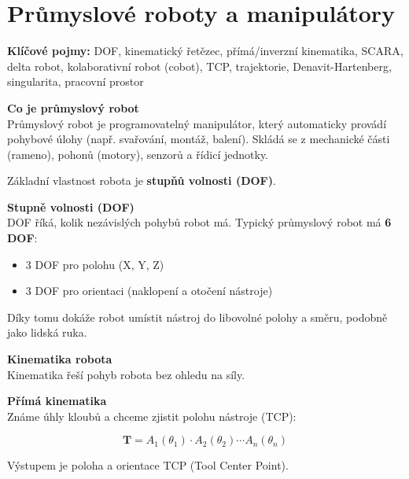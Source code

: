 \documentclass[a4paper,10pt]{article}
\begin{document}
\newpage

\section{Průmyslové roboty a manipulátory}

\begin{pojmybox}
\textbf{Klíčové pojmy:}
DOF, kinematický řetězec, přímá/inverzní kinematika, SCARA,
delta robot, kolaborativní robot (cobot), TCP, trajektorie,
Denavit-Hartenberg, singularita, pracovní prostor
\end{pojmybox}

\begin{vysvetlenibox}

\textbf{Co je průmyslový robot}\\
Průmyslový robot je programovatelný manipulátor, který automaticky
provádí pohybové úlohy (např. svařování, montáž, balení).
Skládá se z mechanické části (rameno), pohonů (motory), senzorů
a řídicí jednotky.

Základní vlastnost robota je \textbf{stupňů volnosti (DOF)}.

\textbf{Stupně volnosti (DOF)}\\
DOF říká, kolik nezávislých pohybů robot má.
Typický průmyslový robot má \textbf{6 DOF}:

\begin{itemize}[noitemsep, leftmargin=1.4em]
    \item 3 DOF pro polohu (X, Y, Z)
    \item 3 DOF pro orientaci (naklopení a otočení nástroje)
\end{itemize}

Díky tomu dokáže robot umístit nástroj do libovolné polohy a směru,
podobně jako lidská ruka.

\textbf{Kinematika robota}\\
Kinematika řeší pohyb robota bez ohledu na síly.

\begin{vzorcebox}

\textbf{Přímá kinematika}\\
Známe úhly kloubů a chceme zjistit polohu nástroje (TCP):

\[
\mathbf{T} = A_1(\theta_1) \cdot A_2(\theta_2) \cdots A_n(\theta_n)
\]

Výstupem je poloha a orientace TCP (Tool Center Point).

\vspace{4pt}


\end{vzorcebox}
\end{vysvetlenibox}
\end{document}
